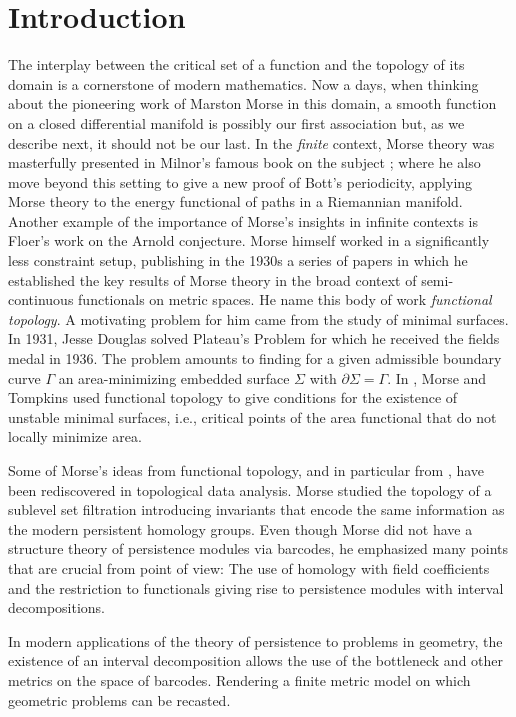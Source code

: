 
\section{Introduction}

The interplay between the critical set of a function and the topology of its domain is a cornerstone of modern mathematics.
Now a days, when thinking about the pioneering work of Marston Morse in this domain, a smooth function on a closed differential manifold is possibly our first association but, as we describe next, it should not be our last.
In the \textit{finite} context, Morse theory was masterfully presented in Milnor's famous book on the subject \cite{MR0163331}; where he also move beyond this setting to give a new proof of Bott's periodicity, applying Morse theory to the energy functional of paths in a Riemannian manifold.
Another example of the importance of Morse's insights in infinite contexts is Floer's work on the Arnold conjecture.
Morse himself worked in a significantly less constraint setup, publishing in the 1930s a series of papers \cite{Morse.1937, Morse.1938, Morse.1940, MR9102} in which he established the key results of Morse theory in the broad context of semi-continuous functionals on metric spaces.
He name this body of work \textit{functional topology}.
A motivating problem for him came from the study of minimal surfaces.
In 1931, Jesse Douglas solved Plateau’s Problem \cite{Douglas.1931} for which he received the fields medal in 1936.
The problem amounts to finding for a given admissible boundary curve $\Gamma$ an area-minimizing embedded surface $\Sigma$ with $\partial \Sigma = \Gamma$.
In \cite{Morse.1939, Morse.1941}, Morse and Tompkins used functional topology to give conditions for the existence of unstable minimal surfaces, i.e., critical points of the area functional that do not locally minimize area.

Some of Morse's ideas from functional topology, and in particular from \cite{Morse.1940}, have been rediscovered in topological data analysis.
Morse studied the topology of a sublevel set filtration introducing invariants that encode the same information as the modern persistent homology groups.
Even though Morse did not have a structure theory of persistence modules via barcodes, he emphasized many points that are crucial from point of view:
The use of homology with field coefficients and the restriction to functionals giving rise to persistence modules with interval decompositions.

In modern applications of the theory of persistence to problems in geometry, the existence of an interval decomposition allows the use of the bottleneck and other metrics on the space of barcodes.
Rendering a finite metric model on which geometric problems can be recasted.

